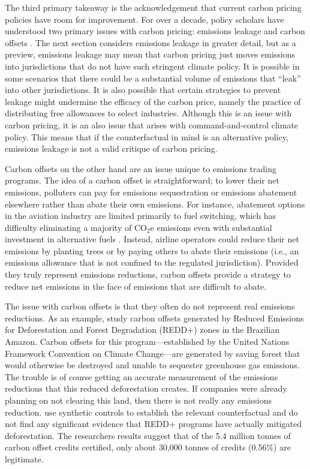 The third primary takeaway is the acknowledgement that current carbon pricing policies have room for improvement. For over a decade, policy scholars have understood two primary issues with carbon pricing: emissions leakage and carbon offsets \citep{cullenward2014carbon}. The next section considers emissions leakage in greater detail, but as a preview, emissions leakage may mean that carbon pricing just moves emissions into jurisdictions that do not have such stringent climate policy. It is possible in some scenarios that there could be a substantial volume of emissions that ``leak'' into other jurisdictions. It is also possible that certain strategies to prevent leakage might undermine the efficacy of the carbon price, namely the practice of distributing free allowances to select industries. Although this is an issue with carbon pricing, it is an also issue that arises with command-and-control climate policy. This means that if the counterfactual in mind is an alternative policy, emissions leakage is not a valid critique of carbon pricing.

Carbon offsets on the other hand are an issue unique to emissions trading programs. The idea of a carbon offset is straightforward; to lower their net emissions, polluters can pay for emissions sequestration or emissions abatement elsewhere rather than abate their own emissions. For instance, abatement options in the aviation industry are limited primarily to fuel switching, which has difficulty eliminating a majority of CO$_2$e emissions even with substantial investment in alternative fuels \citep{dray2022cost}. Instead, airline operators could reduce their net emissions by planting trees or by paying others to abate their emissions (i.e., an emissions allowance that is not confined to the regulated jurisdiction). Provided they truly represent emissions reductions, carbon offsets provide a strategy to reduce net emissions in the face of emissions that are difficult to abate.

The issue with carbon offsets is that they often do not represent real emissions reductions. As an example, \cite{west2020overstated} study carbon offsets generated by Reduced Emissions for Deforestation and Forest Degradation (REDD$+$) zones in the Brazilian Amazon. Carbon offsets for this program---established by the United Nations Framework Convention on Climate Change---are generated by saving forest that would otherwise be destroyed and unable to sequester greenhouse gas emissions. The trouble is of course getting an accurate measurement of the emissions reductions that this reduced deforestation creates. If companies were already planning on not clearing this land, then there is not really any emissions reduction. \cite{west2020overstated} use synthetic controls to establish the relevant counterfactual and do not find any significant evidence that REDD$+$ programs have actually mitigated deforestation. The researchers results suggest that of the 5.4 million tonnes of carbon offset credits certified, only about 30,000 tonnes of credits (0.56\%) are legitimate. 

